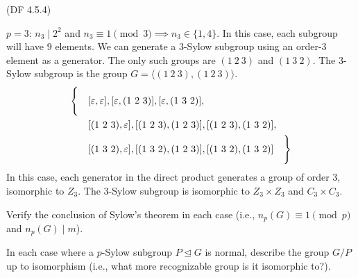 \begin{problem}{(\textsf{DF 4.5.4})}
\begin{enumalph}
\begin{Answer}
\begin{enumalph}
\begin{enumalph}
              \item $p=3$:
                $n_3 \mid 2^2$ and $n_3 \equiv 1 \pmod 3 \implies n_3 \in \{1, 4\}$.
                In this case, each subgroup will have $9$ elements.
                We can generate a $3$-Sylow subgroup using an order-$3$
                element as a generator. The only such groups are $(1\ 2\ 3)$ and $(1\ 3\ 2)$.
                The $3$-Sylow subgroup is the group $G = \langle (1\ 2\ 3), (1\ 2\ 3) \rangle$.
                \begin{align*}
                  \Biggl\{\quad
                      &[\varepsilon, \varepsilon],
                      [\varepsilon, (1\ 2\ 3)],
                      [\varepsilon, (1\ 3\ 2)],\\
                      &[(1\ 2\ 3), \varepsilon],
                      [(1\ 2\ 3), (1\ 2\ 3)],
                      [(1\ 2\ 3), (1\ 3\ 2)],\\
                      &[(1\ 3\ 2), \varepsilon],
                      [(1\ 3\ 2), (1\ 2\ 3)],
                      [(1\ 3\ 2), (1\ 3\ 2)]
                  \quad \Biggl\}
              \end{align*}
              In this case, each generator in the direct product
              generates a group of order $3$, isomorphic to $Z_3$.
              The $3$-Sylow subgroup is isomorphic
              to $Z_3 \times Z_3$ and $C_3 \times C_3$.
            \end{enumalph}
      \end{enumalph}
    \end{Answer}
    \item Verify the conclusion of Sylow's theorem in each case (i.e., $n_p(G) \equiv 1
    \pmod{p}$ and $n_p(G) \mid m$).
    \item In each case where a $p$-Sylow subgroup $P \trianglelefteq G$ is normal, 
    describe the group $G/P$ up to isomorphism (i.e., what more recognizable group is 
    it isomorphic to?).  
    \end{enumalph}
\end{problem}
